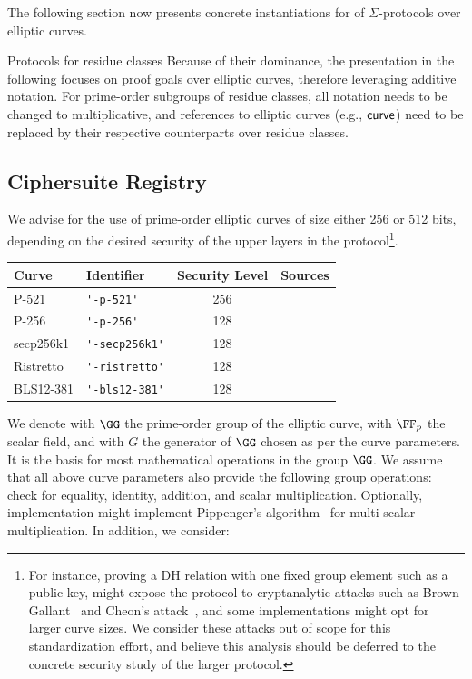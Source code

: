 \documentclass[11pt]{article}
\begin{document}
The following section now presents concrete instantiations for of $\Sigma$-protocols over elliptic curves.

\begin{remark}{Protocols for residue classes}{}
  Because of their dominance, the presentation in the following focuses on proof goals over elliptic curves, therefore leveraging additive notation.
	For prime-order subgroups of residue classes, all notation needs to be changed to multiplicative, and references to elliptic curves (e.g., $\textsf{curve}$) need to be replaced by their respective counterparts over residue classes.
\end{remark}

\subsection{Ciphersuite Registry}
 We advise for the use of prime-order elliptic curves of size either 256 or 512 bits, depending on the desired security of the upper layers in the protocol\footnote{For instance, proving a DH relation with one fixed group element such as a public key, might expose the protocol to cryptanalytic attacks such as Brown-Gallant~\cite{EPRINT:BroGal04} and Cheon's attack~\cite{EC:Cheon06}, and some implementations might opt for larger curve sizes. We consider these attacks out of scope for this standardization effort, and believe this analysis should be deferred to the concrete security study of the larger protocol.}.

 \vspace{1em}
 \begin{center}
 \begin{tabular}{llcc}
  \hline
  Curve  & Identifier &  Security Level & Sources \\
  \hline
 P-521 & \verb|'-p-521'|     & 256& \cite{fips2} \\
 P-256 & \verb|'-p-256'|     & 128 & \cite{fips2}  \\
 secp256k1 & \verb|'-secp256k1'| & 128 & \cite{SECG} \\
 Ristretto & \verb|'-ristretto'| & 128 & \cite{cfrg-ristretto-decaf} \\
 BLS12-381 & \verb|'-bls12-381'| & 128 & \cite{bls12} \\
 \end{tabular}
\end{center}
We denote with $\GG$ the prime-order group of the elliptic curve, with $\FF_p$ the scalar field, and with $G$ the generator of $\GG$ chosen as per the curve parameters. It is the basis for most mathematical operations in the group $\GG$.
We assume that all above curve parameters also provide the following group operations: check for equality, identity, addition, and scalar multiplication. Optionally, implementation might implement Pippenger's algorithm~\cite{pippenger} for multi-scalar multiplication. In addition, we consider:
\end{document}
